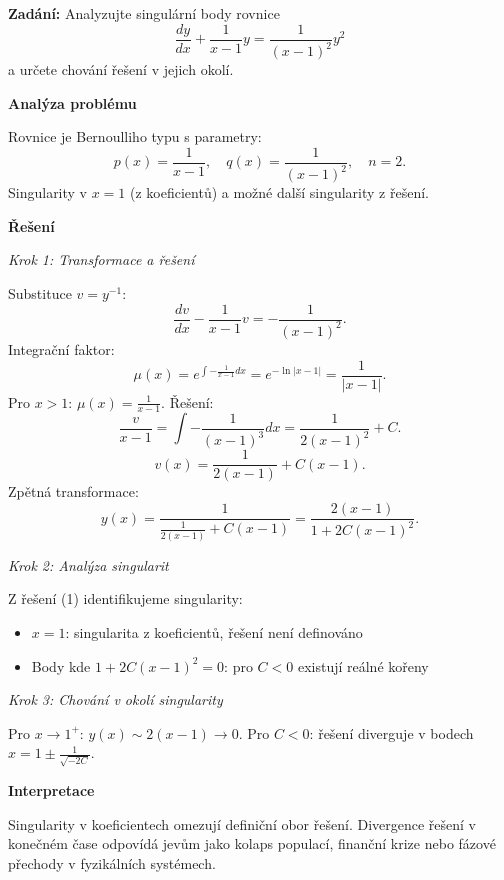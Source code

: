 \begin{example}
\label{ex:b3-singularni-body}

\noindent\textbf{Zadání:} Analyzujte singulární body rovnice
\[
\frac{dy}{dx} + \frac{1}{x-1}y = \frac{1}{(x-1)^2} y^2
\]
a určete chování řešení v jejich okolí.

\vspace{1.5\baselineskip}

\noindent\textbf{Analýza problému}

\noindent Rovnice je Bernoulliho typu s parametry:
\[
p(x) = \frac{1}{x-1}, \quad q(x) = \frac{1}{(x-1)^2}, \quad n = 2.
\]
Singularity v $x = 1$ (z koeficientů) a možné další singularity z řešení.

\vspace{1.5\baselineskip}

\noindent\textbf{Řešení}

\noindent\textit{Krok 1: Transformace a řešení}

Substituce $v = y^{-1}$:
\[
\frac{dv}{dx} - \frac{1}{x-1}v = -\frac{1}{(x-1)^2}.
\]
Integrační faktor:
\[
\mu(x) = e^{\int -\frac{1}{x-1}dx} = e^{-\ln|x-1|} = \frac{1}{|x-1|}.
\]
Pro $x > 1$: $\mu(x) = \frac{1}{x-1}$. Řešení:
\[
\frac{v}{x-1} = \int -\frac{1}{(x-1)^3}dx = \frac{1}{2(x-1)^2} + C.
\]
\[
v(x) = \frac{1}{2(x-1)} + C(x-1).
\]
Zpětná transformace:
\[
y(x) = \frac{1}{\frac{1}{2(x-1)} + C(x-1)} = \frac{2(x-1)}{1 + 2C(x-1)^2}. \tag{1}
\]

\noindent\textit{Krok 2: Analýza singularit}

Z řešení (1) identifikujeme singularity:
\begin{itemize}
\item $x = 1$: singularita z koeficientů, řešení není definováno
\item Body kde $1 + 2C(x-1)^2 = 0$: pro $C < 0$ existují reálné kořeny
\end{itemize}

\noindent\textit{Krok 3: Chování v okolí singularity}

Pro $x \to 1^+$: $y(x) \sim 2(x-1) \to 0$.
Pro $C < 0$: řešení diverguje v bodech $x = 1 \pm \frac{1}{\sqrt{-2C}}$.

\vspace{1.5\baselineskip}

\noindent\textbf{Interpretace}

Singularity v koeficientech omezují definiční obor řešení. Divergence řešení v konečném 
čase odpovídá jevům jako kolaps populací, finanční krize nebo fázové přechody v 
fyzikálních systémech.

\end{example}

